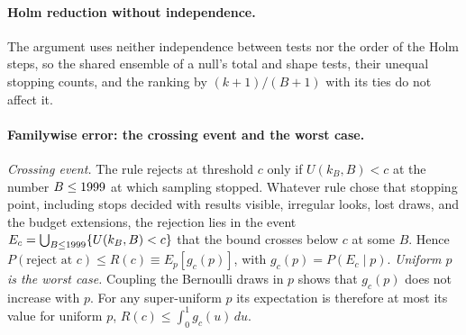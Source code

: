 \paragraph{Holm reduction without independence.} The argument uses neither independence between tests nor the order of the Holm steps, so the shared ensemble of a null's total and shape tests, their unequal stopping counts, and the ranking by $(k+1)/(B+1)$ with its ties do not affect it.

\paragraph{Familywise error: the crossing event and the worst case.} \emph{Crossing event.}  The rule rejects at threshold $c$ only if $U(k_{B},B)<c$ at the number $B\le1999$ at which sampling stopped.  Whatever rule chose that stopping point, including stops decided with results visible, irregular looks, lost draws, and the budget extensions, the rejection lies in the event $E_{c}=\bigcup_{B\le1999}\{U(k_{B},B)<c\}$ that the bound crosses below $c$ at some $B$.  Hence $P(\text{reject at }c)\le R(c)\equiv E_{p}[g_{c}(p)]$, with $g_{c}(p)=P(E_{c}\mid p)$. \emph{Uniform $p$ is the worst case.}  Coupling the Bernoulli draws in $p$ shows that $g_{c}(p)$ does not increase with $p$.  For any super-uniform $p$ its expectation is therefore at most its value for uniform $p$, $R(c)\le\int_{0}^{1}g_{c}(u)\,du$.

